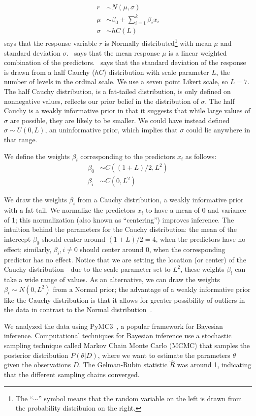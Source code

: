 \begin{align}
 r      & \sim N(\mu, \sigma)                    \label{eq:response-main}                   \\
 \mu    & \sim \beta_0 + \sum_{i=1}^k \beta_i x_i                        \label{eq:mu-main} \\
 \sigma & \sim hC(L) \label{eq:main-sigma}
\end{align}
 says that the response variable $r$ is Normally distributed\footnote{The ``$\sim$'' symbol means that the random variable on the left is drawn from the probability distribuion on the right.} with mean $\mu$ and standard deviation $\sigma$.~ says that the mean response $\mu$ is a linear weighted combination of the predictors.~ says that the standard deviation of the response is drawn from a half Cauchy ($hC$) distribution with scale parameter $L$, the number of levels in the ordinal scale. We use a seven point Likert scale, so $L=7.$ The half Cauchy distribution, is a fat-tailed distribution, is only defined on nonnegative values, reflects our prior belief in the distribution of $\sigma$. The half Cauchy is a weakly informative prior in that it suggests that while large values of $\sigma$ are possible, they are likely to be smaller. We could have instead defined $\sigma \sim U(0, L)$, an uninformative prior, which implies that $\sigma$ could lie anywhere in that range.

We define the weights $\beta_i$ corresponding to the predictors $x_i$ as follows:
\begin{align}
 \beta_0 & \sim C((1+L)/2, L^2) \\
 \beta_i & \sim  C(0, L^2)
\end{align}

We draw the weights $\beta_i$ from a Cauchy distribution, a weakly informative prior with a fat tail. We normalize the predictors $x_i$ to have a mean of 0 and variance of 1; this normalization (also known as ``centering'') improves inference. The intuition behind the parameters for the Cauchy distribution: the mean of the intercept $\beta_0$ should center around $(1+L)/2=4$, when the predictors have no effect; similarly, $\beta_i, i\neq 0$ should center around 0, when the corresponding predictor has no effect. Notice that we are setting the location (or center) of the Cauchy distribution---due to the scale parameter set to $L^2$, these weights $\beta_i$ can take a wide range of values. As an alternative, we can draw the weights $\beta_i \sim N(0, L^2)$ from a Normal prior; the advantage of a weakly informative prior like the Cauchy distribution is that it allows for greater possibility of outliers in the data in contrast to the Normal distribution~\cite{Kay2016}.

We analyzed the data using PyMC3~\cite{Salvatier2016}, a popular framework for Bayesian inference. Computational techniques for Bayesian inference use a stochastic sampling technique called Markov Chain Monte Carlo (MCMC) that samples the posterior distribution $P(\theta | D)$, where we want to estimate the parameters $\theta$ given the observations $D$. The Gelman-Rubin statistic $\hat{R}$ was around 1, indicating that the different sampling chains converged.
